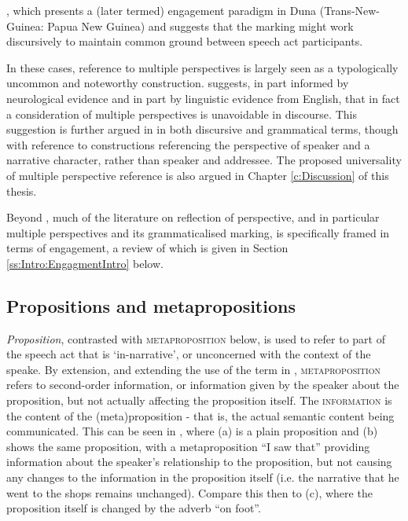 , which presents a (later termed) engagement paradigm in Duna (Trans-New-Guinea: Papua New Guinea) and suggests that the marking might work discursively to maintain common ground between speech act participants.

In these cases, reference to multiple perspectives is largely seen as a typologically uncommon and noteworthy construction.  suggests, in part informed by neurological evidence and in part by linguistic evidence from English, that in fact a consideration of multiple perspectives is unavoidable in discourse. This suggestion is further argued in  in both discursive and grammatical terms, though with reference to constructions referencing the perspective of speaker and a narrative character, rather than speaker and addressee. The proposed universality of multiple perspective reference is also argued in Chapter \ref{c:Discussion} of this thesis. 

Beyond , much of the literature on reflection of perspective, and in particular multiple perspectives and its grammaticalised marking, is specifically framed in terms of engagement, a review of which is given in Section \ref{ss:Intro:EngagmentIntro} below.

\subsection{Propositions and metapropositions}
\textit{Proposition}, contrasted with \textsc{metaproposition} below, is used to refer to part of the speech act that is `in-narrative', or unconcerned with the context of the speake. By extension, and extending the use of the term in , \textsc{metaproposition} refers to second-order information, or information given by the speaker about the proposition, but not actually affecting the proposition itself. The \textsc{information} is the content of the (meta)proposition - that is, the actual semantic content being communicated. This can be seen in , where (a) is a plain proposition and (b) shows the same proposition, with a metaproposition ``I saw that'' providing information about the speaker's relationship to the proposition, but not causing any changes to the information in the proposition itself (i.e. the narrative that he went to the shops remains unchanged). Compare this then to (c), where the proposition itself is changed by the adverb ``on foot''.

